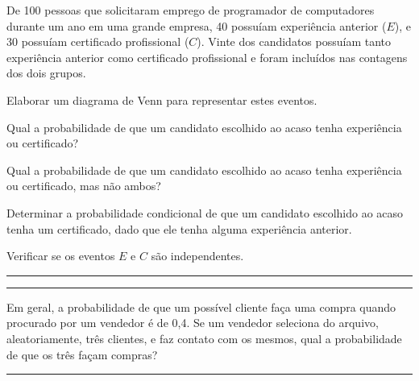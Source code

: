 \documentclass[a4paper,11pt,fleqn]{article}\usepackage[]{graphicx}\usepackage[]{color}
\theoremstyle{definition}
\begin{document}
\begin{compactenum}
\item De 100 pessoas que solicitaram emprego de programador de
  computadores durante um ano em uma grande empresa, 40
  possuíam experiência anterior ($E$), e 30 possuíam certificado
  profissional ($C$). Vinte dos candidatos possuíam tanto experiência
  anterior como certificado profissional e foram incluídos nas contagens
  dos dois grupos.
  \begin{compactenum}
  \item Elaborar um diagrama de Venn para representar estes eventos.
  \item Qual a probabilidade de que um candidato escolhido ao acaso
    tenha experiência ou certificado?
  \item Qual a probabilidade de que um candidato escolhido ao acaso
    tenha experiência ou certificado, mas não ambos?
  \item Determinar a probabilidade condicional de que um candidato
    escolhido ao acaso tenha um certificado, dado que ele tenha alguma
    experiência anterior.
  \item Verificar se os eventos $E$ e $C$ são independentes.
  \end{compactenum}

\vspace{0.3cm}
\hrule
\vspace{0.3cm}

\clearpage

\vspace{0.3cm}
\hrule
\vspace{0.3cm}

\item Em geral, a probabilidade de que um possível cliente faça uma
  compra quando procurado por um vendedor é de 0,4. Se um vendedor
  seleciona do arquivo, aleatoriamente, três clientes, e faz contato com
  os mesmos, qual a probabilidade de que os três façam compras?

\vspace{0.3cm}
\hrule
\vspace{0.3cm}


\end{compactenum}
\end{document}
